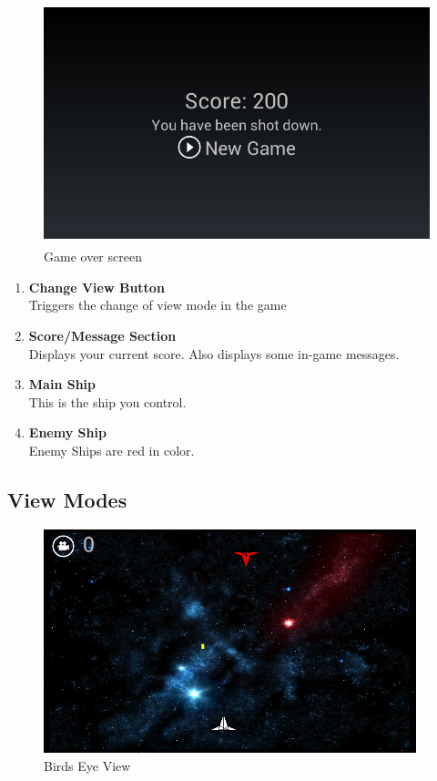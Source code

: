 \documentclass[12pt,a4paper]{article}
\begin{document}
\begin{figure}[h]
\centering 
  \includegraphics[height=70mm]{images/gameover.png}
  \caption{Game over screen}
\end{figure}

\begin{enumerate}
\item \textbf{Change View Button}\\
Triggers the change of view mode in the game
\item \textbf{Score/Message Section}\\
Displays your current score. Also displays some in-game messages.
\item \textbf{Main Ship}\\
This is the ship you control.
\item \textbf{Enemy Ship}\\
Enemy Ships are red in color.
\end{enumerate}


\newpage
\subsection{View Modes}
\begin{figure}[h]
\centering 
  \includegraphics[height=65mm]{images/topview.png}
  \caption{Birds Eye View}
\end{figure}
\end{document}
